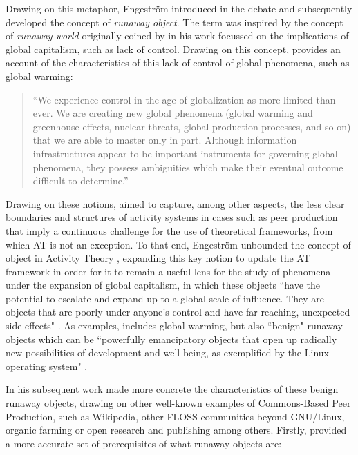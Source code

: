 Drawing on this metaphor, Engestr{\"o}m introduced in the debate \parencite{engestrom2006well} and subsequently developed \parencite{engestrom_future_2009} the concept of \textit{runaway object}. The term was inspired by the concept of \textit{runaway world} originally coined by \textcite{giddens2011runaway} in his work focussed on the implications of global capitalism, such as lack of control. Drawing on this concept, \textcite[98]{ciborra2002labyrinths} provides an account of the characteristics of this lack of control of global phenomena, such as global warming:

\begin{quotation}
 ``We experience control in the age of globalization as more limited than ever. We are creating  new  global  phenomena  (global  warming  and  greenhouse  effects, nuclear  threats, global production processes, and so on) that we are able to master only in part. Although information infrastructures appear to be important instruments for governing global phenomena, they possess ambiguities which make their eventual outcome difficult to determine.''

\end{quotation}

Drawing on these notions, \textcite{engestrom2006well} aimed to capture, among other aspects, the less clear boundaries and structures of activity systems in cases such as peer production that imply a continuous challenge for the use of theoretical frameworks, from which AT is not an exception. To that end, Engestr{\"o}m unbounded the concept of object in Activity Theory \parencite{spinuzzi2011losing}, expanding this key notion to update the AT framework in order for it to remain a useful lens for the study of phenomena under the expansion of global capitalism, in which these objects ``have the potential to escalate and expand up to a global scale of influence. They are objects that are poorly under anyone's control and have far-reaching, unexpected side effects" \parencite[227]{engestrom2008teams}. As examples, \textcite{engestrom_future_2009} includes global warming, but also ``benign" runaway objects which can be ``powerfully  emancipatory objects that open up radically new possibilities of development and well-being, as exemplified by the Linux operating system" \parencite[1784]{engestrom2006well}.


In his subsequent work \textcite{engestrom_future_2009} made more concrete the characteristics of these benign runaway objects, drawing on other well-known examples of Commons-Based Peer Production, such as Wikipedia, other FLOSS communities beyond GNU/Linux, organic farming or open research and publishing among others. Firstly, \textcite[306]{engestrom_future_2009} provided a more accurate set of prerequisites of what runaway objects are:

